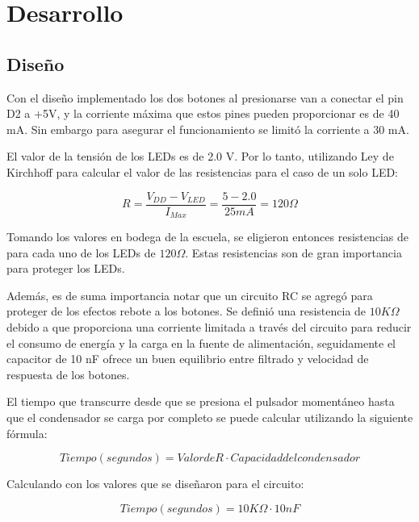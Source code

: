 \section{Desarrollo}

\subsection{Diseño}

Con el diseño implementado los dos botones al presionarse van a conectar el pin D2 a +5V, y  la corriente máxima que estos pines pueden proporcionar es de 40 mA. Sin embargo para asegurar el funcionamiento se limitó la corriente a 30 mA.

El valor de la tensión de los LEDs es de 2.0 V. Por lo tanto, utilizando Ley de Kirchhoff para calcular el valor de las resistencias para el caso de un solo LED:

\begin{equation}
    R = \frac{V_{DD} - V_{LED}}{I_{Max}} = \frac{5 - 2.0}{25 mA} =  120\Omega
\end{equation}

Tomando los valores en bodega de la escuela, se eligieron entonces resistencias de para cada uno de los LEDs de $120 \Omega$. Estas resistencias son de gran importancia para proteger los LEDs.

Además, es de suma importancia notar que un circuito RC se agregó para proteger de los efectos rebote a los botones. Se definió una resistencia de $10 K\Omega$ debido a que proporciona una corriente limitada a través del circuito para reducir el consumo de energía y la carga en la fuente de alimentación, seguidamente el capacitor de 10 nF ofrece un buen equilibrio entre filtrado y velocidad de respuesta de los botones. \cite{drmaker2014debouncing}

El tiempo que transcurre desde que se presiona el pulsador momentáneo hasta que el condensador se carga por completo se puede calcular utilizando la siguiente fórmula:

\begin{equation}
    Tiempo (segundos) = {Valor de R} \cdot {Capacidad del condensador}
\end{equation}

Calculando con los valores que se diseñaron para el circuito:

\begin{equation}
    Tiempo (segundos) = 10 K\Omega \cdot 10 nF
\end{equation}

